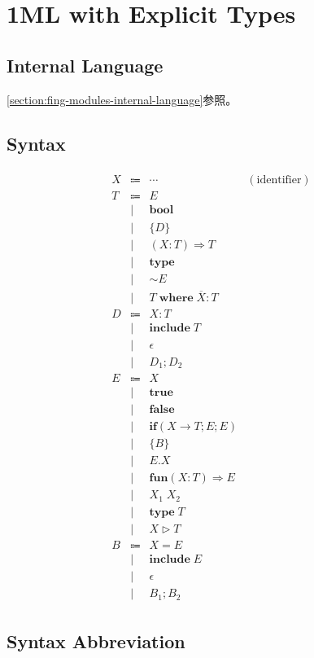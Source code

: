 \section{1ML with Explicit Types}

\cite{Rossberg:2018}

\subsection{Internal Language}

\cref{section:fing-modules-internal-language}参照。

\subsection{Syntax}

\begin{align*}
  \begin{array}{rclr}
    X
    & \Coloneq & \cdots &(\text{identifier}) \\
    T
    & \Coloneq & E \\
    & \mid & \mathbf{bool} \\
    & \mid & \{ D \} \\
    & \mid & (X: T) \Rightarrow T \\
    & \mid & \mathbf{type} \\
    & \mid & \sim E \\
    & \mid & T\; \mathbf{where}\; \overline{X}: T \\
    D
    & \Coloneq & X: T \\
    & \mid & \mathbf{include}\; T \\
    & \mid & \epsilon \\
    & \mid & D_1; D_2 \\
    E
    & \Coloneq & X \\
    & \mid & \mathbf{true} \\
    & \mid & \mathbf{false} \\
    & \mid & \mathbf{if}(X \to T; E; E) \\
    & \mid & \{ B \} \\
    & \mid & E.X \\
    & \mid & \mathbf{fun}(X: T) \Rightarrow E \\
    & \mid & X_1\; X_2 \\
    & \mid & \mathbf{type}\; T \\
    & \mid & X \vartriangleright T \\
    B
    & \Coloneq & X = E \\
    & \mid & \mathbf{include}\; E \\
    & \mid & \epsilon \\
    & \mid & B_1; B_2
  \end{array}
\end{align*}

\subsection{Syntax Abbreviation}
